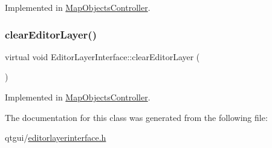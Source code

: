 Implemented in \mbox{\hyperlink{class_map_objects_controller_a6c86ec47a7b85404818cf71335c34269}{Map\+Objects\+Controller}}.

\mbox{\label{class_editor_layer_interface_a7e886341490323a003ccdd497f339dcc}} 
\subsubsection{\texorpdfstring{clearEditorLayer()}{clearEditorLayer()}}
{\footnotesize\ttfamily virtual void Editor\+Layer\+Interface\+::clear\+Editor\+Layer (\begin{DoxyParamCaption}{ }\end{DoxyParamCaption})\hspace{0.3cm}{\ttfamily [pure virtual]}}



Implemented in \mbox{\hyperlink{class_map_objects_controller_a63542e3a1500eddc9262bfc73136bd62}{Map\+Objects\+Controller}}.



The documentation for this class was generated from the following file\+:\begin{DoxyCompactItemize}
\item 
qtgui/\mbox{\hyperlink{editorlayerinterface_8h}{editorlayerinterface.\+h}}\end{DoxyCompactItemize}
